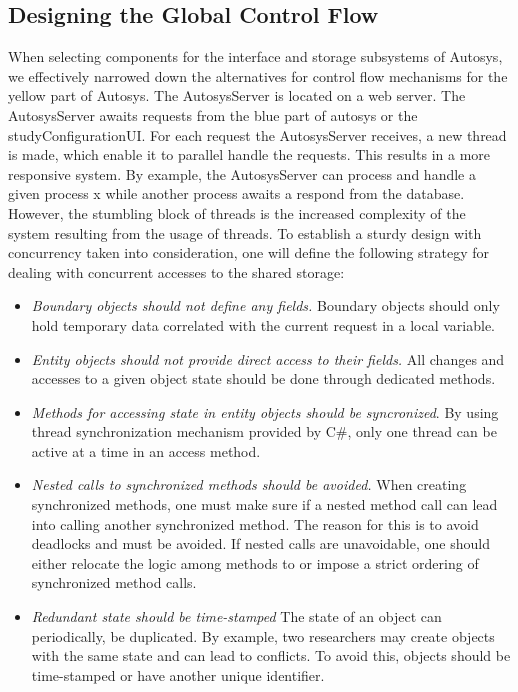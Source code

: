 \subsection{Designing the Global Control Flow}
When selecting components for the interface and storage subsystems of Autosys, we effectively narrowed down the alternatives for control flow mechanisms for the yellow part of Autosys. The AutosysServer is located on a web server. The AutosysServer awaits requests from the blue part of autosys or the studyConfigurationUI. For each request the AutosysServer receives, a new thread is made, which enable it to parallel handle the requests. This results in a more responsive system. By example, the AutosysServer can process and handle a given process x while another process awaits a respond from the database. However, the stumbling block of threads is the increased complexity of the system resulting from the usage of threads. To establish a sturdy design with concurrency taken into consideration, one will define the following strategy for dealing with concurrent accesses to the shared storage:
\begin{itemize}
	\item \textit{Boundary objects should not define any fields.} Boundary objects should only hold temporary data correlated with the current request in a local variable.
	\item \textit{Entity objects should not provide direct access to their fields.} All changes and accesses to a given object state should be done through dedicated methods. 
	\item \textit{Methods for accessing state in entity objects should be syncronized}. By using thread synchronization mechanism provided by C\#, only one thread can be active at a time in an access method.
	\item \textit{Nested calls to synchronized methods should be avoided.} When creating synchronized methods, one must make sure if a nested method call can lead into calling another synchronized method. The reason for this is to avoid deadlocks and must be avoided. If nested calls are unavoidable, one should either relocate the logic among methods to or impose a strict ordering of synchronized method calls.
	\item \textit{Redundant state should be time-stamped} The state of an object can periodically, be duplicated. By example, two researchers may create objects with the same state and can lead to conflicts. To avoid this, objects should be time-stamped or have another unique identifier.

\end{itemize}



